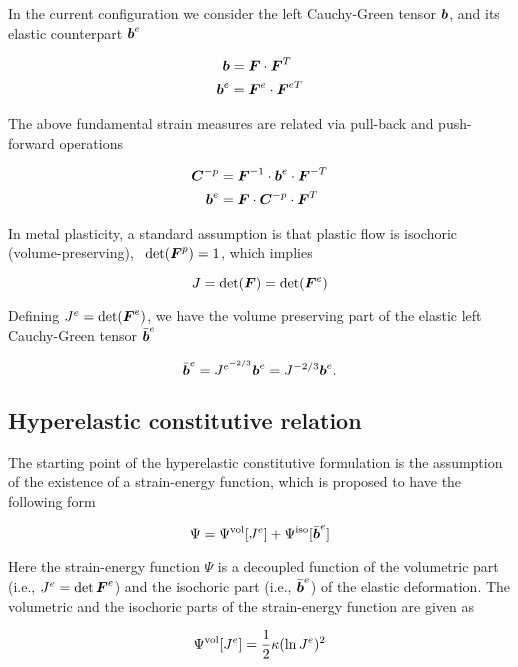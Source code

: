 In the current configuration we consider the left
Cauchy-Green tensor ${\boldsymbol{b}}$, and its elastic counterpart ${{\boldsymbol{b}}}^e$

\begin{align}
  {\boldsymbol{b}} &= {\boldsymbol{F}} \cdot {\boldsymbol{F}}^{T}\\
  {\boldsymbol{b}}^e &= {\boldsymbol{F}}^e \cdot {\boldsymbol{F}}^{eT}\label{eq:be}
\end{align}

The above fundamental strain measures are related via pull-back and
push-forward operations

\begin{align}\label{eq:pullpush}
  {\boldsymbol{C}}^{-p} &={\boldsymbol{F}}^{-1} \cdot {\boldsymbol{b}}^e \cdot {\boldsymbol{F}}^{-T}\\
  {\boldsymbol{b}}^e &= {\boldsymbol{F}} \cdot {\boldsymbol{C}}^{-p} \cdot {\boldsymbol{F}}^T
\end{align}

In metal plasticity, a standard assumption is that plastic flow
is isochoric (volume-preserving), \ie\ $\det({\boldsymbol{F}}^p)=1$, which implies

\begin{equation}
  J = \det ({\boldsymbol{F}}) = \det ({\boldsymbol{F}}^e)
\end{equation}

Defining $J^e=\det({\boldsymbol{F}}^e)$, we have the volume preserving part of the
elastic left Cauchy-Green tensor $\bar{{\boldsymbol{b}}}^e$

\begin{equation}
  \bar{{\boldsymbol{b}}}^e = J^{e^{-2/3}}{\boldsymbol{b}}^e = J^{-2/3}{\boldsymbol{b}}^e.
\end{equation}

\subsection{Hyperelastic constitutive relation}

The starting point of the hyperelastic constitutive formulation is the assumption of the existence of a strain-energy function, which is proposed to have the following form

\begin{equation}
\Psi=\Psi^{\rm vol}[J^e] + \Psi^{\rm iso}[\bar{{\boldsymbol{b}}}^e]
\end{equation}

Here the strain-energy function $\Psi$ is a decoupled function of the volumetric part (i.e., $J^e=\det{\boldsymbol{F}}^e$) and the isochoric part (i.e., $\bar{{\boldsymbol{b}}}^e$) of the elastic deformation. The volumetric and the isochoric parts of the strain-energy function are given as

\begin{equation}
  \Psi^{\rm vol}[J^e] =\frac{1}{2}\kappa(\ln J^e)^2
\end{equation}

